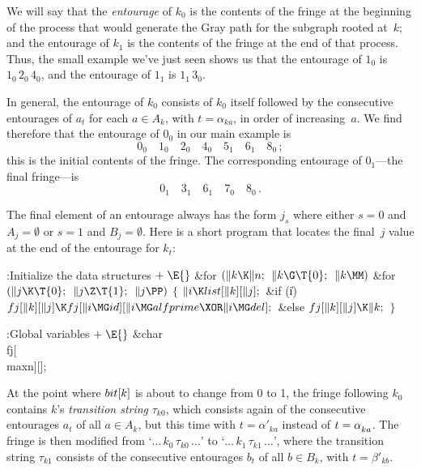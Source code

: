 We will say that the {\it entourage\/} of $k_0$ is the contents of the
fringe at the beginning of the process that would generate the Gray path
for the subgraph rooted at~$k$; and the entourage of $k_1$ is the
contents of the fringe at the end of that process. Thus, the small
example we've just seen shows us that the entourage of $1_0$ is
$1_0\,2_0\,4_0$, and the entourage of $1_1$ is $1_1\,3_0$.

In general, the entourage of $k_0$ consists of $k_0$ itself followed by
the consecutive entourages of $a_t$ for each $a\in A_k$, with $t=\alpha_{ka}$,
in order of increasing~$a$. We find therefore that the entourage of $0_0$
in our main example is
$$0_0\quad 1_0\quad 2_0\quad 4_0\quad 5_1\quad 6_1\quad 8_0\,;$$
this is the initial contents of the fringe. The corresponding entourage of
$0_1$---the final fringe---is
$$0_1\quad 3_1\quad 6_1\quad 7_0\quad 8_0\,.$$

The final element of an entourage always has the form $j_s$ where
either $s=0$ and $A_j=\emptyset$ or $s=1$ and $B_j=\emptyset$.
Here is a short program that locates the final~$j$ value at the
end of the entourage for $k_t$:

\Y\B\4:Initialize the data structures\X${}\mathrel+\E{}$\6
\&{for} ${}(\|k\K\|n;{}$ ${}\|k\G\T{0};{}$ ${}\|k\MM){}$\1\6
\&{for} ${}(\|j\K\T{0};{}$ ${}\|j\Z\T{1};{}$ ${}\|j\PP){}$\5
${}\{{}$\1\6
${}\|i\K\\{list}[\|k][\|j];{}$\6
\&{if} (\|i)\1\5
${}\\{fj}[\|k][\|j]\K\\{fj}[\|i\MG\\{id}][\|i\MG\\{alfprime}\XOR\|i\MG%
\\{del}];{}$\2\6
\&{else}\1\5
${}\\{fj}[\|k][\|j]\K\|k;{}$\2\6
\4${}\}{}$\2\2\par
\fi

\B{}:Global variables\X${}\mathrel+\E{}$\6
\&{char} \\{fj}[\\{maxn}][];\par
\fi

At the point where $\\{bit}[k]$ is about to change from 0 to 1, the fringe
following $k_0$ contains $k$'s {\it transition string\/} $\tau_{k0}$, which
consists again of the consecutive entourages $a_t$ of all $a\in A_k$, but
this time with $t=\alpha'_{ka}$ instead of $t=\alpha\losub{ka}$.
The fringe is then modified from `$\ldots\,k_0\,\tau_{k0}\,\ldots$' to
`$\ldots\,k_1\,\tau_{k1}\,\ldots$',
where the transition string $\tau_{k1}$ consists of the consecutive
entourages $b_t$ of all $b\in B_k$, with $t=\beta'_{kb}$.

